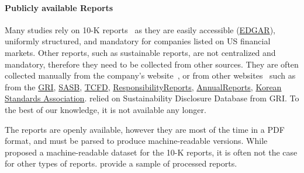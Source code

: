 \paragraph{Publicly available Reports} Many studies rely on 10-K reports~\cite{doran_risk_disclosure, kolbel_ask_2021, chou_ESG, huangFinBERTLargeLanguage2020, krausEnhancingLargeLanguage2023} as they are easily accessible (\href{https://www.sec.gov/edgar}{EDGAR}), uniformly structured, and mandatory for companies listed on US financial markets. Other reports, such as sustainable reports, are not centralized and mandatory, therefore they need to be collected from other sources. They are often collected manually from the company's website~\cite{kheradmand2021a, rouenEvolutionESGReports2023, lai_using_2023, hyewon_kang_analyzing_2022, auzepy_evaluating_2023, bjarne_brie_mandatory_2022, nicolas_webersinke_climatebert_2021}, or from other websites~\cite{luccioni_analyzing_2020, kheradmand2021a, bronzini_glitter_2023, LEE2023119726, marco_polignano_nlp_2022, krausEnhancingLargeLanguage2023} such as from the \href{https://www.globalreporting.org/how-to-use-the-gri-standards/register-your-report/}{GRI}, \href{https://sasb.ifrs.org/company-use/sasb-reporters/}{SASB}, \href{https://www.tcfdhub.org/reports}{TCFD}, \href{https://www.responsibilityreports.com/}{ResponsibilityReports}, \href{https://www.annualreports.com/}{AnnualReports}, \href{https://www.ksa.or.kr}{Korean Standards Association}. \citet{marco_polignano_nlp_2022} relied on Sustainability Disclosure Database from GRI. To the best of our knowledge, it is not available any longer. 

The reports are openly available, however they are most of the time in a PDF format, and must be parsed to produce machine-readable versions. While~\citet{financial-reports-sec} proposed a machine-readable dataset for the 10-K reports, it is often not the case for other types of reports. \cite{bronzini_glitter_2023, marco_polignano_nlp_2022, hyewon_kang_analyzing_2022} provide a sample of processed reports. 

